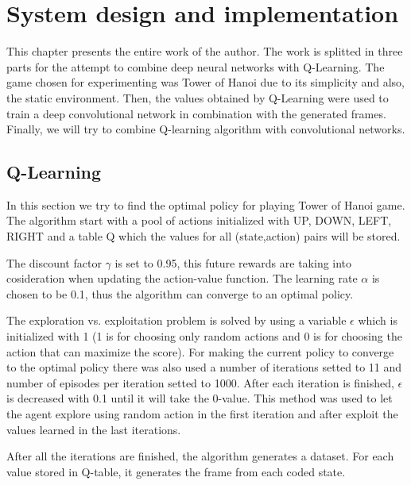 \chapter{System design and implementation}
\label{chapter:system-design}

This chapter presents the entire work of the author. The work is splitted in three parts for the attempt to combine deep neural networks with Q-Learning. The game chosen for experimenting was Tower of Hanoi due to its simplicity and also, the static environment. Then, the values obtained by Q-Learning were used to train a deep convolutional network in combination with the generated frames. Finally, we will try to combine Q-learning algorithm with convolutional networks.



\section{Q-Learning}

In this section we try to find the optimal policy for playing Tower of Hanoi game. The algorithm start with a pool of actions initialized with {UP, DOWN, LEFT, RIGHT} and a table Q which the values for all (state,action) pairs will be stored. 

The discount factor $\gamma$ is set to 0.95, this future rewards are taking into cosideration when updating the action-value function. The learning rate $\alpha$ is chosen to be 0.1, thus the algorithm can converge to an optimal policy. 

The exploration vs. exploitation problem is solved by using a variable $\epsilon$ which is initialized with 1 (1 is for choosing only random actions and 0 is for choosing the action that can maximize the score). For making the current policy to converge to the optimal policy there was also used a number of iterations setted to 11 and number of episodes per iteration setted to 1000. After each iteration is finished, $\epsilon$ is decreased with 0.1 until it will take the 0-value. This method was used to let the agent explore using random action in the first iteration and after exploit the values learned in the last iterations.

After all the iterations are finished, the algorithm generates a dataset. For each value stored in Q-table, it generates the frame from each coded state.

